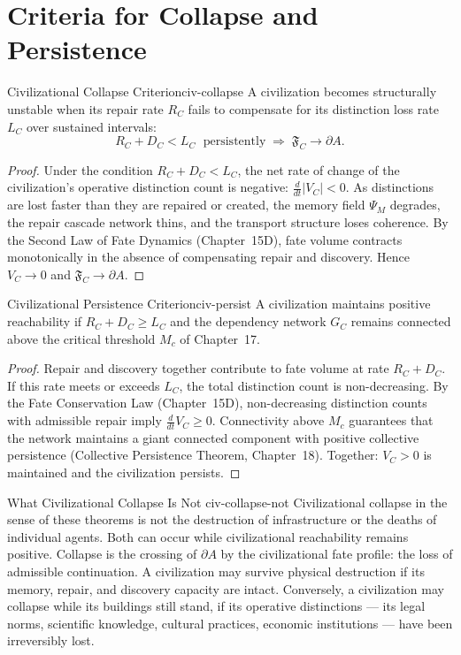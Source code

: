 \documentclass[12pt,twoside,openright]{book}
\newcommand{\admRegion}{A}
\providecommand{\admRegion}{A}
\providecommand{\discRate}{D_{C}}
\providecommand{\lossRate}{L_{C}}
\providecommand{\repairRate}{R_{C}}
\providecommand{\memField}{\Psi_{M}}
\providecommand{\distNet}{G}
\providecommand{\distNetV}{V}
\providecommand{\civFate}{\mathfrak{F}_{C}}
\providecommand{\civReach}{V_{C}}
\providecommand{\critThresh}{M_{c}}
\begin{document}
\section{Criteria for Collapse and Persistence}

\begin{theorem}{Civilizational Collapse Criterion}{civ-collapse}
A civilization becomes structurally unstable when its repair
rate $\repairRate$ fails to compensate for its distinction
loss rate $\lossRate$ over sustained intervals:
\[
  \repairRate + \discRate < \lossRate
  \;\text{ persistently}
  \;\Longrightarrow\;
  \civFate\to\partial\admRegion.
\]
\begin{proof}
Under the condition $\repairRate+\discRate<\lossRate$, the net
rate of change of the civilization's operative distinction
count is negative: $\frac{d}{dt}|\distNetV_C|<0$. As
distinctions are lost faster than they are repaired or created,
the memory field $\memField$ degrades, the repair cascade
network thins, and the transport structure loses coherence.
By the Second Law of Fate Dynamics (Chapter~15D), fate volume
contracts monotonically in the absence of compensating repair
and discovery. Hence $\civReach\to 0$ and
$\civFate\to\partial\admRegion$.
\end{proof}
\end{theorem}

\begin{theorem}{Civilizational Persistence Criterion}{civ-persist}
A civilization maintains positive reachability if
$\repairRate + \discRate \ge \lossRate$ and the dependency
network $\distNet_C$ remains connected above the critical
threshold $\critThresh$ of Chapter~17.
\begin{proof}
Repair and discovery together contribute to fate volume at
rate $\repairRate+\discRate$. If this rate meets or exceeds
$\lossRate$, the total distinction count is non-decreasing.
By the Fate Conservation Law (Chapter~15D), non-decreasing
distinction counts with admissible repair imply
$\frac{d}{dt}\civReach\ge 0$. Connectivity above $\critThresh$
guarantees that the network maintains a giant connected
component with positive collective persistence (Collective
Persistence Theorem, Chapter~18). Together: $\civReach>0$
is maintained and the civilization persists.
\end{proof}
\end{theorem}

\begin{remark}{What Civilizational Collapse Is Not}%
  {civ-collapse-not}
Civilizational collapse in the sense of these theorems is not
the destruction of infrastructure or the deaths of individual
agents. Both can occur while civilizational reachability
remains positive. Collapse is the crossing of $\partial\admRegion$
by the civilizational fate profile: the loss of admissible
continuation. A civilization may survive physical destruction
if its memory, repair, and discovery capacity are intact.
Conversely, a civilization may collapse while its buildings
still stand, if its operative distinctions --- its legal
norms, scientific knowledge, cultural practices, economic
institutions --- have been irreversibly lost.
\end{remark}
\end{document}
